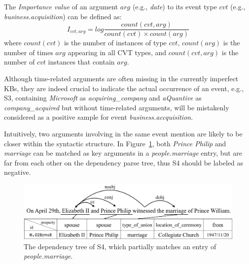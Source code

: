 The \emph{Importance value} of an argument $arg$ (e.g., \emph{date}) to its event type $cvt$ (e.g., \emph{business.acquisition}) can be defined as:
\begin{equation}
	I_{cvt, arg} = log \frac{count(cvt, arg)}{count(cvt) \times count(arg)} 
\end{equation}
where $count(cvt)$ is the number of instances of type $cvt$, $count(arg)$ is the number of times $arg$ appearing in all CVT types, and $count(cvt, arg)$ is the number of $cvt$ instances that contain $arg$.

Although time-related arguments are often missing in the currently imperfect KBs, 
they are indeed crucial to indicate the actual occurrence of an event, e.g., S3, containing \emph{Microsoft} as \emph{acquiring\_company} and \emph{aQuantive} as \emph{company\_acquired} but without time-related arguments, will be mistakenly considered as a positive sample for event \emph{business.accquisition}.

Intuitively, two arguments involving in the same event mention are likely to be closer within the syntactic structure.
In Figure~\ref{fig:2}, both \emph{Prince Philip} and \emph{marriage} can be matched as key arguments in a \textit{people.marriage} entry, but are far from each other on the dependency parse tree, thus S4 should be labeled as negative.

\begin{figure}
\centering
	\includegraphics[width=.47\textwidth]{temp_figure2}
	\caption{The dependency tree of S4, which partially matches an entry of \emph{people.marriage}. \label{fig:2}}
\end{figure}

